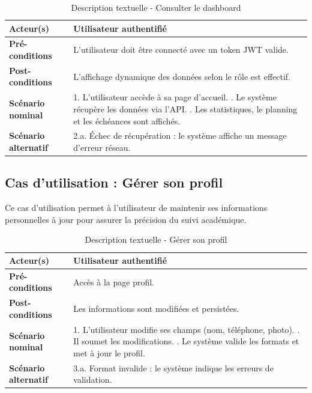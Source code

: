 \begin{table}[H]
\centering
\small
\begin{tabularx}{\textwidth}{|l|X|}
\hline
\rowcolor[HTML]{EFEFEF} 
\textbf{Acteur(s)} & Utilisateur authentifié \\ \hline
\textbf{Pré-conditions} & L'utilisateur doit être connecté avec un token JWT valide. \\ \hline
\textbf{Post-conditions} & L'affichage dynamique des données selon le rôle est effectif. \\ \hline
\textbf{Scénario nominal} & 
1. L'utilisateur accède à sa page d'accueil. \newline
2. Le système récupère les données via l'API. \newline
3. Les statistiques, le planning et les échéances sont affichés. \\ \hline
\textbf{Scénario alternatif} & 
2.a. Échec de récupération : le système affiche un message d'erreur réseau. \\ \hline
\end{tabularx}
\caption{Description textuelle - Consulter le dashboard}
\end{table}

\subsection{Cas d'utilisation : Gérer son profil}
Ce cas d'utilisation permet à l'utilisateur de maintenir ses informations personnelles à jour pour assurer la précision du suivi académique.

\begin{table}[H]
\centering
\small
\begin{tabularx}{\textwidth}{|l|X|}
\hline
\rowcolor[HTML]{EFEFEF} 
\textbf{Acteur(s)} & Utilisateur authentifié \\ \hline
\textbf{Pré-conditions} & Accès à la page profil. \\ \hline
\textbf{Post-conditions} & Les informations sont modifiées et persistées. \\ \hline
\textbf{Scénario nominal} & 
1. L'utilisateur modifie ses champs (nom, téléphone, photo). \newline
2. Il soumet les modifications. \newline
3. Le système valide les formats et met à jour le profil. \\ \hline
\textbf{Scénario alternatif} & 
3.a. Format invalide : le système indique les erreurs de validation. \\ \hline
\end{tabularx}
\caption{Description textuelle - Gérer son profil}
\end{table}


